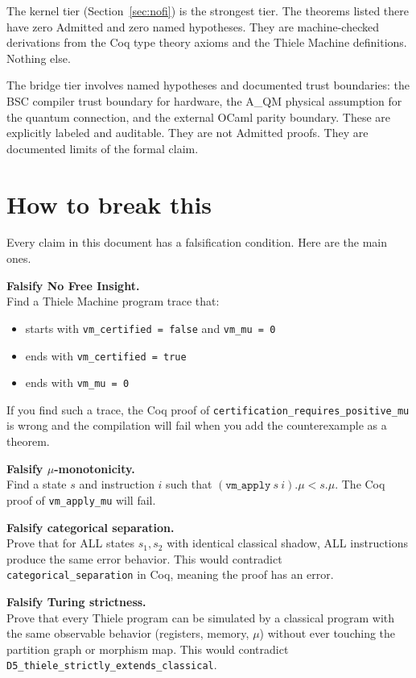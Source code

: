 \documentclass[11pt,a4paper]{article}
\theoremstyle{plain}
\theoremstyle{definition}
\theoremstyle{remark}
\begin{document}
The kernel tier (Section~\ref{sec:nofi}) is the strongest tier. The theorems listed there have zero Admitted and zero named hypotheses. They are machine-checked derivations from the Coq type theory axioms and the Thiele Machine definitions. Nothing else.

The bridge tier involves named hypotheses and documented trust boundaries: the BSC compiler trust boundary for hardware, the A\_QM physical assumption for the quantum connection, and the external OCaml parity boundary. These are explicitly labeled and auditable. They are not Admitted proofs. They are documented limits of the formal claim.

\section{How to break this}
\label{sec:falsification}

Every claim in this document has a falsification condition. Here are the main ones.

\medskip
\noindent\textbf{Falsify No Free Insight.}\\
Find a Thiele Machine program trace that:
\begin{itemize}
\item starts with \texttt{vm\_certified = false} and \texttt{vm\_mu = 0}
\item ends with \texttt{vm\_certified = true}
\item ends with \texttt{vm\_mu = 0}
\end{itemize}
If you find such a trace, the Coq proof of \texttt{certification\_requires\_positive\_mu} is wrong and the compilation will fail when you add the counterexample as a theorem.

\medskip
\noindent\textbf{Falsify $\mu$-monotonicity.}\\
Find a state $s$ and instruction $i$ such that $(\texttt{vm\_apply}\ s\ i).\mu < s.\mu$. The Coq proof of \texttt{vm\_apply\_mu} will fail.

\medskip
\noindent\textbf{Falsify categorical separation.}\\
Prove that for ALL states $s_1, s_2$ with identical classical shadow, ALL instructions produce the same error behavior. This would contradict \texttt{categorical\_separation} in Coq, meaning the proof has an error.

\medskip
\noindent\textbf{Falsify Turing strictness.}\\
Prove that every Thiele program can be simulated by a classical program with the same observable behavior (registers, memory, $\mu$) without ever touching the partition graph or morphism map. This would contradict \texttt{D5\_thiele\_strictly\_extends\_classical}.
\end{document}
